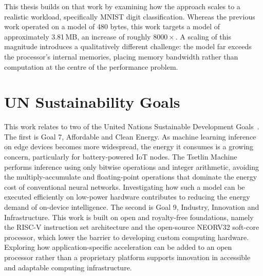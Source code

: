 This thesis builds on that work by examining how the approach scales to a realistic workload, specifically MNIST digit classification. Whereas the previous work operated on a model of 480 bytes, this work targets a model of approximately 3.81\,MB, an increase of roughly $8000\times$. A scaling of this magnitude introduces a qualitatively different challenge: the model far exceeds the processor's internal memories, placing memory bandwidth rather than computation at the centre of the performance problem.


\section{UN Sustainability Goals}
This work relates to two of the United Nations Sustainable Development Goals~\cite{UNSDG}. The first is Goal 7, Affordable and Clean Energy. As machine learning inference on edge devices becomes more widespread, the energy it consumes is a growing concern, particularly for battery-powered IoT nodes. The Tsetlin Machine performs inference using only bitwise operations and integer arithmetic, avoiding the multiply-accumulate and floating-point operations that dominate the energy cost of conventional neural networks. Investigating how such a model can be executed efficiently on low-power hardware contributes to reducing the energy demand of on-device intelligence. The second is Goal 9, Industry, Innovation and Infrastructure. This work is built on open and royalty-free foundations, namely the RISC-V instruction set architecture and the open-source NEORV32 soft-core processor, which lower the barrier to developing custom computing hardware. Exploring how application-specific acceleration can be added to an open processor rather than a proprietary platform supports innovation in accessible and adaptable computing
infrastructure.


